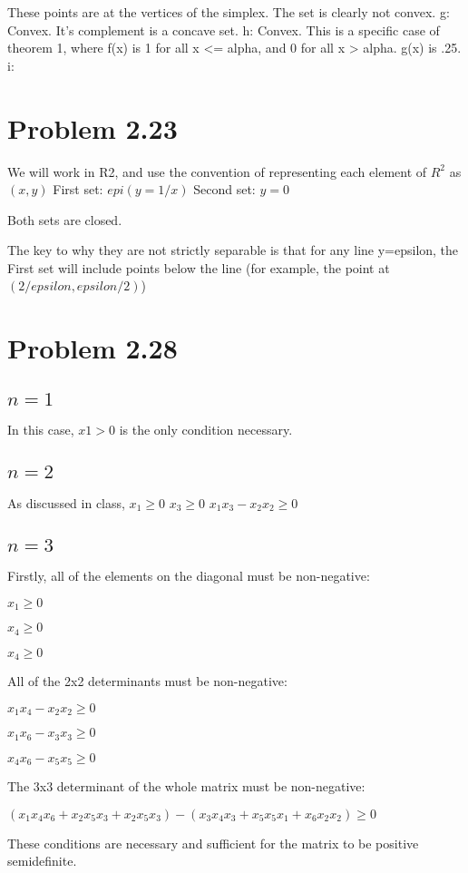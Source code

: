 \documentclass[a4paper]{article}
\begin{document}
These points are at the vertices of the simplex. The set is clearly not convex.
g:
Convex. It’s complement is a concave set.
h:
Convex. This is a specific case of theorem 1, where f(x) is 1 for all x <= alpha, and 0 for all x > alpha. g(x) is .25.
i:


\section{Problem 2.23}
We will work in R2, and use the convention of representing each element of $R^2$ as $(x, y)$
First set: $epi(y=1/x)$
Second set: $y=0$

Both sets are closed.

The key to why they are not strictly separable is that for any line y=epsilon, the First set will include points below the line (for example, the point at $(2/epsilon, epsilon/2)$)

\section{Problem 2.28}
\subsection{$n = 1$}
In this case, $x1 > 0$ is the only condition necessary.

\subsection{$n = 2$}
As discussed in class,
$x_1 \geq 0$
$x_3 \geq 0$
$x_1x_3 - x_2x_2 \geq 0$

\subsection{$n = 3$}
Firstly, all of the elements on the diagonal must be non-negative:

$x_1 \geq 0$

$x_4 \geq 0$

$x_4 \geq 0$


All of the 2x2 determinants must be non-negative:

$x_1x_4 - x_2x_2 \geq 0$

$x_1x_6 - x_3x_3 \geq 0$

$x_4x_6 - x_5x_5 \geq 0$


The 3x3 determinant of the whole matrix must be non-negative:

$(x_1x_4x_6 + x_2x_5x_3 + x_2x_5x_3) - (x_3x_4x_3 + x_5x_5x_1 + x_6x_2x_2) \geq 0$

These conditions are necessary and sufficient for the matrix to be positive semidefinite.
\end{document}
